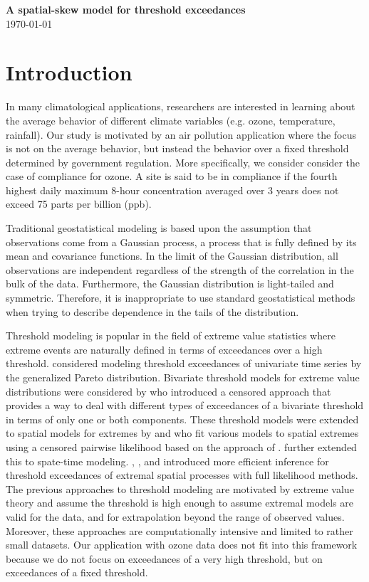 \documentclass[11pt]{article}
\begin{document}
\linenumbers

\begin{center}
{\Large {\bf A spatial-skew model for threshold exceedances}}\\
\today
\end{center}

\section{Introduction}\label{s:intro}
In many climatological applications, researchers are interested in learning about the average behavior of different climate variables (e.g. ozone, temperature, rainfall).
Our study is motivated by an air pollution application where the focus is not on the average behavior, but instead the behavior over a fixed threshold determined by government regulation.
More specifically, we consider consider the case of compliance for ozone.
A site is said to be in compliance if the fourth highest daily maximum 8-hour concentration averaged over 3 years does not exceed 75 parts per billion (ppb).

Traditional geostatistical modeling is based upon the assumption that observations come from a Gaussian process, a process that is fully defined by its mean and covariance functions.
In the limit of the Gaussian distribution, all observations are independent regardless of the strength of the correlation in the bulk of the data.
Furthermore, the Gaussian distribution is light-tailed and symmetric.
Therefore, it is inappropriate to use standard geostatistical methods when trying to describe dependence in the tails of the distribution.

Threshold modeling is popular in the field of extreme value statistics where extreme events are naturally defined in terms of exceedances over a high threshold.
\citet{Davison1990} considered modeling threshold exceedances of univariate time series by the generalized Pareto distribution.
Bivariate threshold models for extreme value distributions were considered by \citet{Ledford1996} who introduced a censored approach that provides a way to deal with different types of exceedances of a bivariate threshold in terms of only one or both components.
These threshold models were extended to spatial models for extremes by \citet{Wadsworth2012} and \citet{Thibaud2013} who fit various models to spatial extremes using a censored pairwise likelihood \citep{Padoan2010} based on the approach of \citet{Ledford1996}.
\citet{Huser2014} further extended this to spate-time modeling.
\citet{Engelke2014}, \citet{Wadsworth2014}, and \citet{Thibaud2013a} introduced more efficient inference for threshold exceedances of extremal spatial processes with full likelihood methods.
The previous approaches to threshold modeling are motivated by extreme value theory and assume the threshold is high enough to assume extremal models are valid for the data, and for extrapolation beyond the range of observed values.
Moreover, these approaches are computationally intensive and limited to rather small datasets.
Our application with ozone data does not fit into this framework because we do not focus on exceedances of a very high threshold, but on exceedances of a fixed threshold.
\end{document}
